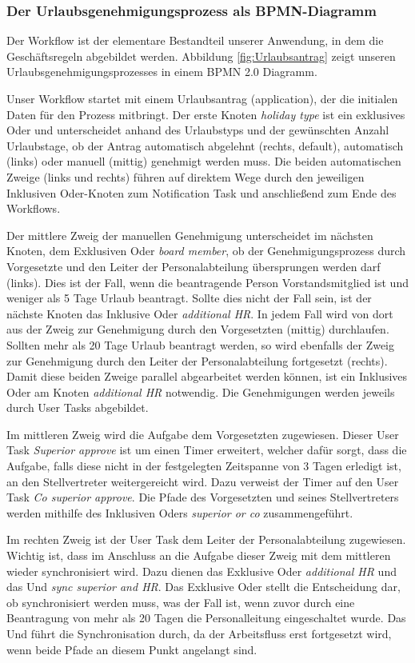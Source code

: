 \subsubsection{Der Urlaubsgenehmigungsprozess als BPMN-Diagramm}
Der Workflow ist der elementare Bestandteil unserer Anwendung, in dem die Geschäftsregeln abgebildet werden. Abbildung \ref{fig:Urlaubsantrag} zeigt unseren Urlaubsgenehmigungsprozesses in einem BPMN 2.0 Diagramm.

Unser Workflow startet mit einem Urlaubsantrag (application), der die initialen Daten für den Prozess mitbringt. Der erste Knoten \textit{holiday type} ist ein exklusives Oder und unterscheidet anhand des Urlaubstyps und der gewünschten Anzahl Urlaubstage, ob der Antrag automatisch abgelehnt (rechts, default), automatisch (links) oder manuell (mittig) genehmigt werden muss. Die beiden automatischen Zweige (links und rechts) führen auf direktem Wege durch den jeweiligen Inklusiven Oder-Knoten zum Notification Task und anschließend zum Ende des Workflows.

Der mittlere Zweig der manuellen Genehmigung unterscheidet im nächsten Knoten, dem Exklusiven Oder \textit{board member}, ob der Genehmigungsprozess durch Vorgesetzte und den Leiter der Personalabteilung übersprungen werden darf (links). Dies ist der Fall, wenn die beantragende Person Vorstandsmitglied ist und weniger als 5 Tage Urlaub beantragt. Sollte dies nicht der Fall sein, ist der nächste Knoten das Inklusive Oder \textit{additional HR}. In jedem Fall wird von dort aus der Zweig zur Genehmigung durch den Vorgesetzten (mittig) durchlaufen. Sollten mehr als 20 Tage Urlaub beantragt werden, so wird ebenfalls der Zweig zur Genehmigung durch den Leiter der Personalabteilung fortgesetzt (rechts). Damit diese beiden Zweige parallel abgearbeitet werden können, ist ein Inklusives Oder am Knoten \textit{additional HR} notwendig. Die Genehmigungen werden jeweils durch User Tasks abgebildet.

Im mittleren Zweig wird die Aufgabe dem Vorgesetzten zugewiesen. Dieser User Task \textit{Superior approve} ist um einen Timer erweitert, welcher dafür sorgt, dass die Aufgabe, falls diese nicht in der festgelegten Zeitspanne von 3 Tagen erledigt ist, an den Stellvertreter weitergereicht wird. Dazu verweist der Timer auf den User Task \textit{Co superior approve}. Die Pfade des Vorgesetzten und seines Stellvertreters werden mithilfe des Inklusiven Oders \textit{superior or co} zusammengeführt.

Im rechten Zweig ist der User Task dem Leiter der Personalabteilung zugewiesen. Wichtig ist, dass im Anschluss an die Aufgabe dieser Zweig mit dem mittleren wieder synchronisiert wird. Dazu dienen das Exklusive Oder \textit{additional HR} und das Und \textit{sync superior and HR}. Das Exklusive Oder stellt die Entscheidung dar, ob synchronisiert werden muss, was der Fall ist, wenn zuvor durch eine Beantragung von mehr als 20 Tagen die Personalleitung eingeschaltet wurde. Das Und führt die Synchronisation durch, da der Arbeitsfluss erst fortgesetzt wird, wenn beide Pfade an diesem Punkt angelangt sind.

